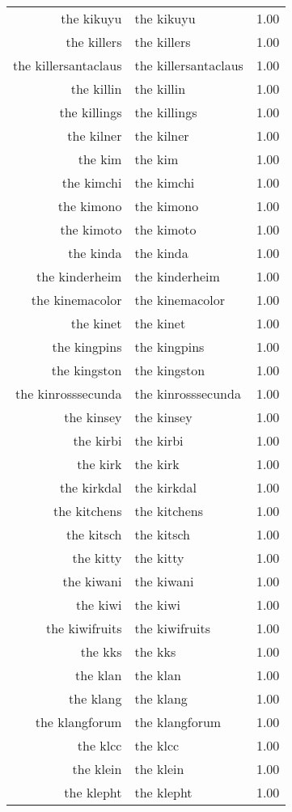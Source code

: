 \begin{table}[ht]
\begin{tabular}{rlr}
  the kikuyu & the kikuyu & 1.00 \\ 
  the killers & the killers & 1.00 \\ 
  the killersantaclaus & the killersantaclaus & 1.00 \\ 
  the killin & the killin & 1.00 \\ 
  the killings & the killings & 1.00 \\ 
  the kilner & the kilner & 1.00 \\ 
  the kim & the kim & 1.00 \\ 
  the kimchi & the kimchi & 1.00 \\ 
  the kimono & the kimono & 1.00 \\ 
  the kimoto & the kimoto & 1.00 \\ 
  the kinda & the kinda & 1.00 \\ 
  the kinderheim & the kinderheim & 1.00 \\ 
  the kinemacolor & the kinemacolor & 1.00 \\ 
  the kinet & the kinet & 1.00 \\ 
  the kingpins & the kingpins & 1.00 \\ 
  the kingston & the kingston & 1.00 \\ 
  the kinrosssecunda & the kinrosssecunda & 1.00 \\ 
  the kinsey & the kinsey & 1.00 \\ 
  the kirbi & the kirbi & 1.00 \\ 
  the kirk & the kirk & 1.00 \\ 
  the kirkdal & the kirkdal & 1.00 \\ 
  the kitchens & the kitchens & 1.00 \\ 
  the kitsch & the kitsch & 1.00 \\ 
  the kitty & the kitty & 1.00 \\ 
  the kiwani & the kiwani & 1.00 \\ 
  the kiwi & the kiwi & 1.00 \\ 
  the kiwifruits & the kiwifruits & 1.00 \\ 
  the kks & the kks & 1.00 \\ 
  the klan & the klan & 1.00 \\ 
  the klang & the klang & 1.00 \\ 
  the klangforum & the klangforum & 1.00 \\ 
  the klcc & the klcc & 1.00 \\ 
  the klein & the klein & 1.00 \\ 
  the klepht & the klepht & 1.00 \\ 

\end{tabular}
\end{table}
